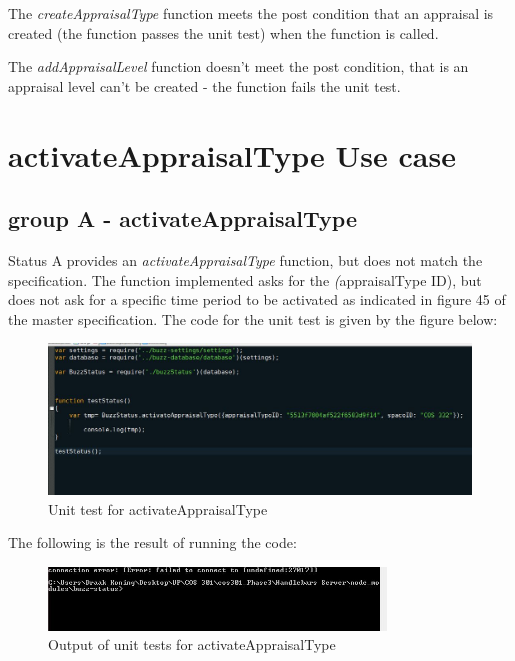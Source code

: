 \documentclass[a4paper,12pt]{article}
\begin{document}
The \textit{createAppraisalType} function meets the post condition that an appraisal is created (the function passes the unit test) when the function is called.

The \textit{addAppraisalLevel} function doesn't meet the post condition, that is an appraisal level can't be created - the function fails the unit test.

\newpage
\section{activateAppraisalType Use case}
\subsection{group A - activateAppraisalType}

Status A provides an \textit{activateAppraisalType} function, but does not match the specification. The function implemented asks for the \textit(appraisalType ID), but does not ask for a specific time period to be activated as indicated in figure 45 of the master specification. The code for the unit test is given by the figure below:


	\begin{figure}[H]
		\centering
		\includegraphics[width=1.0\textwidth]{Figures/activateTypeAtestcode.JPG}
		\caption{Unit test for activateAppraisalType}
	\end{figure}

The following is the result of running the code:

	\begin{figure}[H]
		\centering
		\includegraphics[width=0.8\textwidth]{Figures/activateTypeAResult.JPG}
		\caption{Output of unit tests for activateAppraisalType}
	\end{figure}
\end{document}
